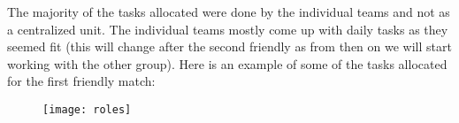 The majority of the tasks allocated were done by the individual teams and not as a centralized unit. The individual teams mostly come up with daily tasks as they seemed fit (this will change after the second friendly as from then on we will start working with the other group). Here is an example of some of the tasks allocated for the first friendly match:

\begin{figure}[H]
    \centering
    \texttt{[image: roles]}
    \label{fig:networkdiagram}
\end{figure}

